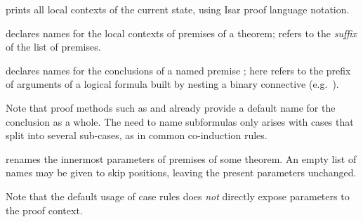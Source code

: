 \begin{isabellebody}
\begin{isamarkuptext}
\begin{descr}
  \item [\hyperlink{command.print-cases}{\mbox{\isa{\isacommand{print{\isacharunderscore}cases}}}}] prints all local contexts of the
  current state, using Isar proof language notation.
  
  \item [\hyperlink{attribute.case-names}{\mbox{\isa{case{\isacharunderscore}names}}}~\isa{{\isachardoublequote}c\isactrlsub {\isadigit{1}}\ {\isasymdots}\ c\isactrlsub k{\isachardoublequote}}]
  declares names for the local contexts of premises of a theorem;
   refers to the \emph{suffix} of the
  list of premises.
  
  \item [\hyperlink{attribute.case-conclusion}{\mbox{\isa{case{\isacharunderscore}conclusion}}}~\isa{{\isachardoublequote}c\ d\isactrlsub {\isadigit{1}}\ {\isasymdots}\ d\isactrlsub k{\isachardoublequote}}] declares names for the conclusions of a named premise
  ; here  refers to the
  prefix of arguments of a logical formula built by nesting a binary
  connective (e.g.\ \isa{{\isachardoublequote}{\isasymor}{\isachardoublequote}}).
  
  Note that proof methods such as \hyperlink{method.induct}{\mbox{}} and \hyperlink{method.coinduct}{\mbox{}} already provide a default name for the conclusion as a
  whole.  The need to name subformulas only arises with cases that
  split into several sub-cases, as in common co-induction rules.

  \item [\hyperlink{attribute.params}{\mbox{\isa{params}}}~\isa{{\isachardoublequote}p\isactrlsub {\isadigit{1}}\ {\isasymdots}\ p\isactrlsub m\ {\isasymAND}\ {\isasymdots}\ q\isactrlsub {\isadigit{1}}\ {\isasymdots}\ q\isactrlsub n{\isachardoublequote}}] renames the innermost parameters of
  premises  of some theorem.  An empty list of names
  may be given to skip positions, leaving the present parameters
  unchanged.
  
  Note that the default usage of case rules does \emph{not} directly
  expose parameters to the proof context.
  

\end{descr}
\end{isamarkuptext}
\end{isabellebody}
